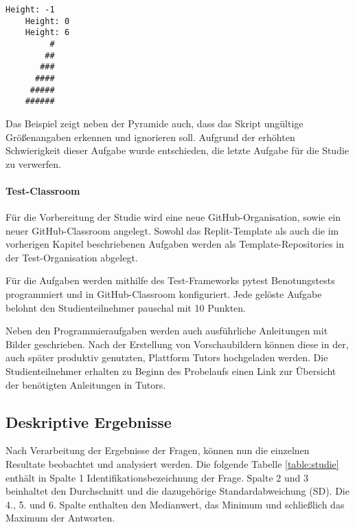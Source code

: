 \begin{lstlisting}[style=Bash]
    Height: -1
    Height: 0
    Height: 6
         #
        ##
       ###
      ####
     #####
    ######
\end{lstlisting}

Das Beispiel zeigt neben der Pyramide auch, dass das Skript ungültige
Größenangaben erkennen und ignorieren soll. Aufgrund der erhöhten Schwierigkeit
dieser Aufgabe wurde entschieden, die letzte Aufgabe für die Studie zu
verwerfen.

\paragraph{Test-Classroom}
Für die Vorbereitung der Studie wird eine neue GitHub-Organisation, sowie ein
neuer GitHub-Classroom angelegt. Sowohl das Replit-Template als auch die im
vorherigen Kapitel beschriebenen Aufgaben werden als Template-Repositories in
der Test-Organisation abgelegt.

Für die Aufgaben werden mithilfe des Test-Frameworks pytest Benotungstests
programmiert und in GitHub-Classroom konfiguriert. Jede gelöste Aufgabe belohnt
den Studienteilnehmer pauschal mit 10 Punkten.

Neben den Programmieraufgaben werden auch ausführliche Anleitungen mit
Bilder geschrieben. Nach der Erstellung von Vorschaubildern können diese in der,
auch später produktiv genutzten, Plattform Tutors hochgeladen werden. Die
Studienteilnehmer erhalten zu Beginn des Probelaufs einen Link zur Übersicht der benötigten Anleitungen in Tutors.

\newpage
\subsection{Deskriptive Ergebnisse}
Nach Verarbeitung der Ergebnisse der Fragen, können nun die einzelnen Resultate
beobachtet und analysiert werden. Die folgende Tabelle \ref{table:studie}
enthält in Spalte 1 Identifikationsbezeichnung der Frage. Spalte 2 und 3
beinhaltet den Durchschnitt und die dazugehörige Standardabweichung (SD).
Die 4., 5. und 6. Spalte enthalten den Medianwert, das Minimum und 
schließlich das Maximum der Antworten.

